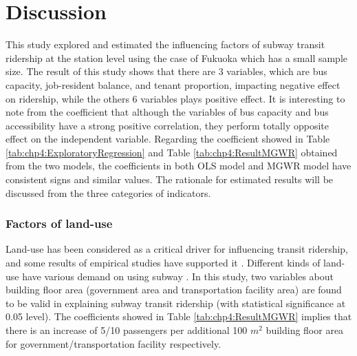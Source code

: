 \section{Discussion}
%
This study explored and estimated the influencing factors of subway transit ridership at the station level using the case of Fukuoka which has a small sample size. The result of this study shows that there are 3 variables, which are bus capacity, job-resident balance, and tenant proportion, impacting negative effect on ridership, while the others 6 variables plays positive effect. It is interesting to note from the coefficient that although the variables of bus capacity and bus accessibility have a strong positive correlation, they perform totally opposite effect on the independent variable. Regarding the coefficient showed in Table \ref{tab:chp4:ExploratoryRegression} and Table \ref{tab:chp4:ResultMGWR} obtained from the two models, the coefficients in both OLS model and MGWR model have consistent signs and similar values. The rationale for estimated results will be discussed from the three categories of indicators.

%
\subsubsection{Factors of land-use}
%
Land-use has been considered as a critical driver for influencing transit ridership, and some results of empirical studies have supported it \cite{sohn2010factors,zhao2013influences,chakraborty2013land}. Different kinds of land-use have various demand on using subway \cite{chakraborty2013land}. In this study, two variables about building floor area (government area and transportation facility area) are found to be valid in explaining subway transit ridership (with statistical significance at 0.05 level). The coefficients showed in Table \ref{tab:chp4:ResultMGWR} implies that there is an increase of 5/10 passengers per additional 100 $m^2$ building floor area for government/transportation facility respectively. 


